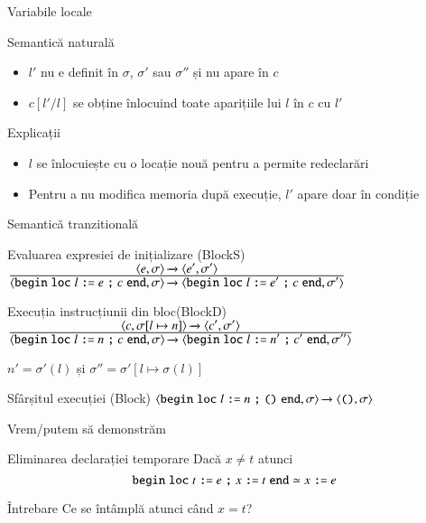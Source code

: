 \begin{section}{Variabile locale}
\begin{frame}{Semantică naturală}
\begin{itemize}
\item $l'$ nu e definit în $\sigma$, $\sigma'$ sau $\sigma''$ și nu apare în $c$
\item $c[l'/l]$ se obține înlocuind toate aparițiile lui $l$ în $c$ cu $l'$
\end{itemize}

\vfill
\begin{block}{Explicații}
\begin{itemize}
\item $l$ se înlocuiește cu o locație nouă pentru a permite redeclarări

\item Pentru a nu modifica memoria după execuție, $l'$ apare doar în condiție
\end{itemize}
\end{block}
\end{frame}

\begin{frame}{Semantică	 tranzitională}
\begin{block}{Evaluarea expresiei de inițializare \hfill (BlockS)}
$\reg{\Ss{\c{\Sbegin {\Sloc l \terminal{:=} e} \terminal{;} c \Send, \sigma}}{\c{\Sbegin {\Sloc l \terminal{:=} e'} \terminal{;} c \Send, \sigma'}}}{\Ss{\c{e,\sigma}}{\c{e',\sigma'}}}{}$
\end{block}
\vfill
\begin{block}{Execuția instrucțiunii din bloc\hfill (BlockD)}
$\reg{\Ss{\c{\Sbegin {\Sloc l \terminal{:=} n} \terminal{;} c \Send, \sigma}}{\c{\Sbegin {\Sloc l \terminal{:=} n'} \terminal{;} c' \Send, \sigma''}}}{\Ss{\c{c,\sigma[l\mapsto n]}}{\c{c',\sigma'}}}{}$

\hfill $n' = \sigma'(l)$ și $\sigma'' = \sigma'[l\mapsto \sigma(l)]$ 
\end{block}

\begin{block}{Sfârșitul execuției \hfill (Block)}
$\reg{\Ss{\c{\Sbegin {\Sloc l \terminal{:=} n} \terminal{;} {\Sskip} \Send, \sigma}}{\c{\Sskip, \sigma}}}{}{}$
\end{block}
\end{frame}

\begin{frame}{Vrem/putem să demonstrăm}
\begin{block}{Eliminarea declarației temporare}
Dacă $x\neq t$ atunci 
\[{\mathrel{\text{\ttfamily begin}} {\mathrel{\text{\ttfamily loc}} t \mathrel{\text{\ttfamily :=}} e} \mathrel{\text{\ttfamily ;}} x \mathrel{\text{\ttfamily :=}} t \mathrel{\text{\ttfamily end}}} \simeq x \mathrel{\text{\ttfamily :=}} e\]
\end{block}

\begin{block}{Întrebare}
Ce se întâmplă atunci când $x = t$?
\end{block}
\end{frame}

\end{section}
